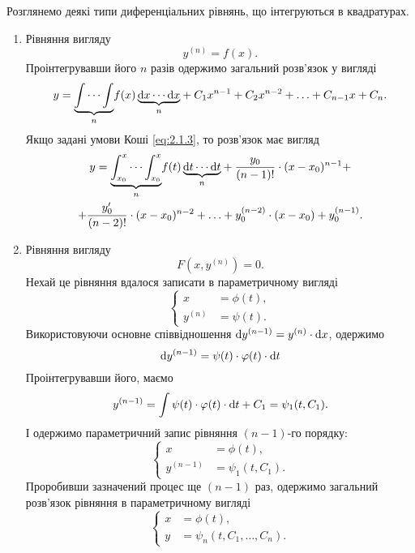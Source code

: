 Розглянемо деякі типи диференціальних рівнянь, що інтегруються в квадратурах.

\begin{enumerate}
\item Рівняння вигляду
\begin{equation}
	\label{eq:2.2.1}
	y^{(n)} = f(x).
\end{equation}
Проінтегрувавши його $n$ разів одержимо загальний розв’язок у вигляді
\begin{equation}
	\label{eq:2.2.2}
	y = \underset{n}{\underbrace{\int \cdots \int}} f(x) \,\underset{n}{\underbrace{\mathop{}\!\mathrm{d} x \cdots \mathop{}\!\mathrm{d} x}} + C_1 x^{n-1} + C_2 x^{n-2} + \ldots + C_{n-1} x + C_n.
\end{equation}
Якщо задані умови Коші \eqref{eq:2.1.3}, то розв’язок має вигляд
\begin{multline}
	\label{eq:2.2.3}
	y = \underset{n}{\underbrace{\int_{x_0}^x \cdots \int_{x_0}^x}} f(t) \, \underset{n}{\underbrace{\mathop{}\!\mathrm{d} t \cdots \mathop{}\!\mathrm{d} t}} + \frac{y_0}{(n-1)!} \cdot (x-x_0)^{n-1} + \\ 
	+ \frac{y_0'}{(n-2)!} \cdot (x-x_0)^{n-2} + \ldots + y_0^{(n-2)} \cdot (x-x_0) + y_0^{(n-1)}.
\end{multline}
\item Рівняння вигляду
\begin{equation}
	\label{eq:2.2.4}
	F\left(x, y^{(n)}\right) = 0.
\end{equation}
Нехай це рівняння вдалося записати в параметричному вигляді
\begin{equation}
	\label{eq:2.2.5}
	\left\{
		\begin{aligned}
			x &= \phi(t), \\
			y^{(n)} &= \psi (t).
		\end{aligned}
	\right.
\end{equation}
Використовуючи основне співвідношення $\mathop{}\!\mathrm{d} y^{(n-1)} = y^{(n)} \cdot \mathop{}\!\mathrm{d} x$, одержимо
\begin{equation}
	\label{eq:2.2.6}
	\mathop{}\!\mathrm{d} y^{(n-1)} = \psi(t) \cdot \varphi(t) \cdot \mathop{}\!\mathrm{d} t
\end{equation}
Проінтегрувавши його, маємо 
  \begin{equation}
	\label{eq:2.2.7}
	y^{(n-1)} = \int \psi(t) \cdot \varphi(t) \cdot \mathop{}\!\mathrm{d} t + C_1 = \psi_1(t, C_1).
\end{equation}
І одержимо параметричний запис рівняння $(n-1)$-го порядку:
\begin{equation}
	\label{eq:2.2.8}
	\left\{
		\begin{aligned}
			x &= \phi(t), \\
			y^{(n-1)} &= \psi_1(t, C_1).
		\end{aligned}
	\right.
\end{equation}
Проробивши зазначений процес ще $(n-1)$ раз, одержимо загальний розв’язок рівняння в параметричному вигляді
\begin{equation}
	\label{eq:2.2.9}
	\left\{
		\begin{aligned}
			x &= \phi(t), \\
			y &= \psi_n(t, C_1, \ldots, C_n).
		\end{aligned}
	\right.
\end{equation}
 

\end{enumerate}
